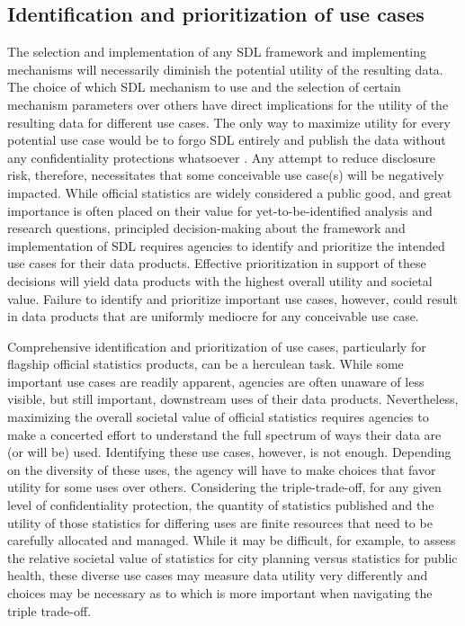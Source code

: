 \subsection{Identification and prioritization of use cases}
The selection and implementation of any SDL framework and implementing mechanisms will necessarily diminish the potential utility of the resulting data. The choice of which SDL mechanism to use and the selection of certain mechanism parameters over others have direct implications for the utility of the resulting data for different use cases. The only way to maximize utility for every potential use case would be to forgo SDL entirely and publish the data without any confidentiality protections whatsoever \cite{dinur:nissim:2003:10.1145/773153.773173}. Any attempt to reduce disclosure risk, therefore, necessitates that some conceivable use case(s) will be negatively impacted. While official statistics are widely considered a public good, and great importance is often placed on their value for yet-to-be-identified analysis and research questions, principled decision-making about the framework and implementation of SDL requires agencies to identify and prioritize the intended use cases for their data products. Effective prioritization in support of these decisions will yield data products with the highest overall utility and societal value. Failure to identify and prioritize important use cases, however, could result in data products that are uniformly mediocre for any conceivable use case. 

Comprehensive identification and prioritization of use cases, particularly for flagship official statistics products, can be a herculean task. While some important use cases are readily apparent, agencies are often unaware of less visible, but still important, downstream uses of their data products. Nevertheless, maximizing the overall societal value of official statistics requires agencies to make a concerted effort to understand the full spectrum of ways their data are (or will be) used. Identifying these use cases, however, is not enough. Depending on the diversity of these uses, the agency will have to make choices that favor utility for some uses over others. Considering the triple-trade-off, for any given level of confidentiality protection, the quantity of statistics published and the utility of those statistics for differing uses are finite resources that need to be carefully allocated and managed. While it may be difficult, for example, to assess the relative societal value of statistics for city planning versus statistics for public health, these diverse use cases may measure data utility very differently and choices may be necessary as to which is more important when navigating the triple trade-off.  

